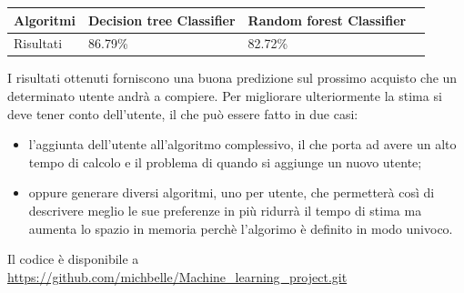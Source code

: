 \documentclass{article}
\begin{document}
\begin{tabular}{|p{}|p{}|p{}|p{}|}
\hline
Algoritmi          & Decision tree Classifier         &Random forest Classifier      \\
\hline
Risultati           & 86.79\%    & 82.72\%  \\
\hline
\end{tabular}

I risultati ottenuti forniscono una buona predizione sul prossimo acquisto che un determinato utente andrà a compiere. Per migliorare ulteriormente  la stima si deve tener conto dell'utente, il che può essere fatto in due casi:
\begin{itemize}
\item l'aggiunta dell'utente all'algoritmo complessivo, il che porta ad avere un alto tempo di calcolo e il problema  di quando si aggiunge un nuovo utente;
\item oppure generare diversi algoritmi, uno per utente, che permetterà così di descrivere meglio le sue preferenze in più ridurrà il tempo di stima ma aumenta lo spazio in memoria perchè l'algorimo è definito in modo univoco.
\end{itemize}
Il codice è disponibile a \url{https://github.com/michbelle/Machine_learning_project.git}

\nocite{*}
\printbibliography[title=Bibliografia]{}
\end{document}
